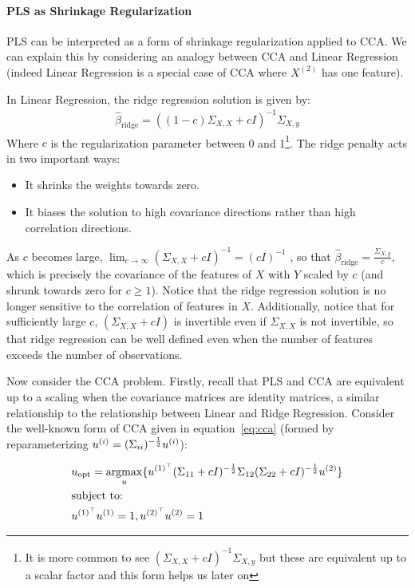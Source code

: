 \paragraph{PLS as Shrinkage Regularization}

PLS can be interpreted as a form of shrinkage regularization applied to CCA. We can explain this by considering an analogy between CCA and Linear Regression (indeed Linear Regression is a special case of CCA where \(X^{(2)}\) has one feature).

In Linear Regression, the ridge regression solution is given by:
\begin{align}
    \hat{\beta}_{\text{ridge}} = ((1-c)\Sigma_{X,X} + c I)^{-1} \Sigma_{X,y}
\end{align}
Where \(c\) is the regularization parameter between 0 and 1\footnote{It is more common to see $(\Sigma_{X,X} + c I)^{-1} \Sigma_{X,y}$ but these are equivalent up to a scalar factor and this form helps us later on}.
The ridge penalty acts in two important ways:
\begin{itemize}
    \item It shrinks the weights towards zero.
    \item It biases the solution to high covariance directions rather than high correlation directions.
\end{itemize}

As $c$ becomes large, $\lim_{c \to \infty} (\Sigma_{X,X} + c I)^{-1} = (c I)^{-1}$
, so that $\hat{\beta}_{\text{ridge}}=\frac{\Sigma_{X,y}}{c}$, which is precisely the covariance of the features of $X$ with $Y$ scaled by $c$ (and shrunk towards zero for $c \geq 1$).
Notice that the ridge regression solution is no longer sensitive to the correlation of features in $X$.
Additionally, notice that for sufficiently large $c$, $(\Sigma_{X,X} + c I)$ is invertible even if $\Sigma_{X,X}$ is not invertible, so that ridge regression can be well defined even when the number of features exceeds the number of observations.

Now consider the CCA problem.
Firstly, recall that PLS and CCA are equivalent up to a scaling when the covariance matrices are identity matrices, a similar relationship to the relationship between Linear and Ridge Regression.
Consider the well-known form of CCA given in equation~\ref{eq:cca}\citep{mihalik2022canonical} (formed by reparameterizing \(u^{(i)}=(\Sigma_{ii})^{-\frac{1}{2}}u^{(i)}\)):

\begin{align}\label{eq:cca}
     & u_{\text{opt}}=\underset{u}{\mathrm{argmax}}\{ u^{(1)^{\top}}(\Sigma_{11}+ c I)^{-\frac{1}{2}}\Sigma_{12}(\Sigma_{22}+c I)^{-\frac{1}{2}}u^{(2)} \} \\
     & \text{subject to:} \notag \\
     & u^{(1)^{\top}}u^{(1)}=1, u^{(2)^{\top}}u^{(2)}=1 \notag
\end{align}

